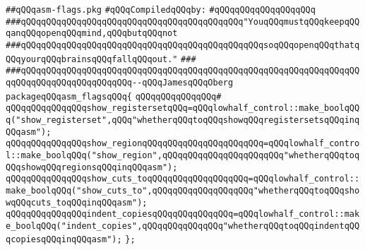 \label{src/lib/compiler/back/low/emit/asm-flags.pkg}
\verb|##qQQqasm-flags.pkg|\newline
\newline
\verb|#qQQqCompiledqQQqby:|\newline
\verb|#qQQqqQQqqQQqqQQqqQQq|\newline
\newline
\newline
\newline
\verb|###qQQqqQQqqQQqqQQqqQQqqQQqqQQqqQQqqQQqqQQqqQQq"YouqQQqmustqQQqkeepqQQqanqQQqopenqQQqmind,qQQqbutqQQqnot|\newline
\verb|###qQQqqQQqqQQqqQQqqQQqqQQqqQQqqQQqqQQqqQQqqQQqqQQqsoqQQqopenqQQqthatqQQqyourqQQqbrainsqQQqfallqQQqout."|\newline
\verb|###|\newline
\verb|###qQQqqQQqqQQqqQQqqQQqqQQqqQQqqQQqqQQqqQQqqQQqqQQqqQQqqQQqqQQqqQQqqQQqqQQqqQQqqQQqqQQqqQQqqQQq--qQQqJamesqQQqOberg|\newline
\newline
\newline
\verb|packageqQQqasm_flagsqQQq{|\newline
\verb|qQQqqQQqqQQqqQQq#|\newline
\verb|qQQqqQQqqQQqqQQqshow_registersetqQQq=qQQqlowhalf_control::make_boolqQQq("show_registerset",qQQq"whetherqQQqtoqQQqshowqQQqregistersetsqQQqinqQQqasm");|\newline
\verb|qQQqqQQqqQQqqQQqshow_regionqQQqqQQqqQQqqQQqqQQqqQQq=qQQqlowhalf_control::make_boolqQQq("show_region",qQQqqQQqqQQqqQQqqQQqqQQq"whetherqQQqtoqQQqshowqQQqregionsqQQqinqQQqasm");|\newline
\verb|qQQqqQQqqQQqqQQqshow_cuts_toqQQqqQQqqQQqqQQqqQQq=qQQqlowhalf_control::make_boolqQQq("show_cuts_to",qQQqqQQqqQQqqQQqqQQq"whetherqQQqtoqQQqshowqQQqcuts_toqQQqinqQQqasm");|\newline
\verb|qQQqqQQqqQQqqQQqindent_copiesqQQqqQQqqQQqqQQq=qQQqlowhalf_control::make_boolqQQq("indent_copies",qQQqqQQqqQQqqQQq"whetherqQQqtoqQQqindentqQQqcopiesqQQqinqQQqasm");|\newline
\verb|};|\newline

